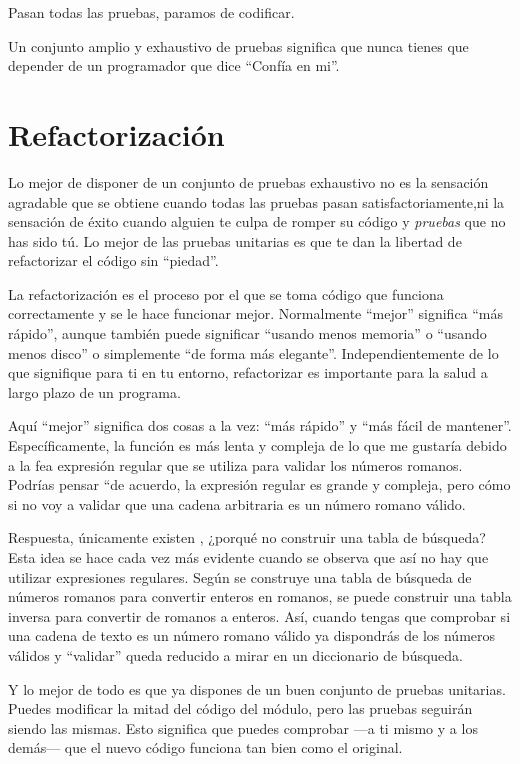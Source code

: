 Pasan todas las pruebas, paramos de codificar.

Un conjunto amplio y exhaustivo de pruebas significa que nunca tienes que depender de un programador que dice ``Confía en mi''.

\section{Refactorización}

Lo mejor de disponer de un conjunto de pruebas exhaustivo no es la sensación agradable que se obtiene cuando todas las pruebas pasan satisfactoriamente,ni la sensación de éxito cuando alguien te culpa de romper su código y \emph{pruebas} que no has sido tú. Lo mejor de las pruebas unitarias es que te dan la libertad de refactorizar el código sin ``piedad''.

La refactorización es el proceso por el que se toma código que funciona correctamente y se le hace funcionar mejor. Normalmente ``mejor'' significa ``más rápido'', aunque también puede significar ``usando menos memoria'' o ``usando menos disco'' o simplemente ``de forma más elegante''. Independientemente de lo que signifique para ti en tu entorno, refactorizar es importante para la salud a largo plazo de un programa.

Aquí ``mejor'' significa dos cosas a la vez: ``más rápido'' y ``más fácil de mantener''. Específicamente, la función  es más lenta y compleja de lo que me gustaría debido a la fea expresión regular que se utiliza para validar los números romanos. Podrías pensar ``de acuerdo, la expresión regular es grande y compleja, pero cómo si no voy a validar que una cadena arbitraria es un número romano válido.

Respuesta, únicamente existen , ¿porqué no construir una tabla de búsqueda? Esta idea se hace cada vez más evidente cuando se observa que así no hay que utilizar expresiones regulares. Según se construye una tabla de búsqueda de números romanos para convertir enteros en romanos, se puede construir una tabla inversa para convertir de romanos a enteros. Así, cuando tengas que comprobar si una cadena de texto es un número romano válido ya dispondrás de los números válidos y ``validar'' queda reducido a mirar en un diccionario de búsqueda.

Y lo mejor de todo es que ya dispones de un buen conjunto de pruebas unitarias. Puedes modificar la mitad del código del módulo, pero las pruebas seguirán siendo las mismas. Esto significa que puedes comprobar ---a ti mismo y a los demás--- que el nuevo código funciona tan bien como el original.

